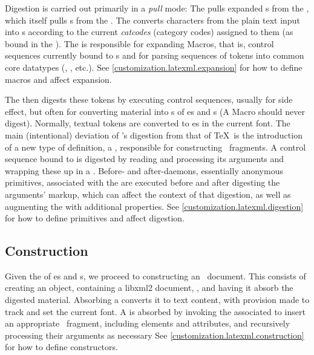 \documentclass{book}
\begin{document}
Digestion is carried out primarily in a \emph{pull} mode: The 
pulls expanded s from the , which itself pulls s from 
the .  The  converts characters from the plain text input
into s according to the current \emph{catcodes} (category codes) assigned to
them (as bound in the ).  
The  is responsible for expanding Macros,
that is, control sequences currently bound to s
and for parsing sequences of tokens into common core datatypes
(, , etc.).
See \ref{customization.latexml.expansion} for how to define macros
and affect expansion.

The  then digests these tokens by executing  control 
sequences, usually for side effect, but often for converting material
into s of es and s
(A Macro should never digest).
Normally, textual tokens are converted to es in the current font.
The main (intentional) deviation of \LaTeXML's digestion from that of \TeX\ is
the introduction of a new type of definition, a ,
responsible for constructing \XML\ fragments.
A control sequence bound to  is digested by
reading and processing its arguments and wrapping these up in a .
Before- and after-daemons, essentially anonymous primitives, associated with
the  are executed before and after digesting the 
arguments' markup, which can affect the context of that digestion, as well
as augmenting the  with additional properties.
See \ref{customization.latexml.digestion} for how to define primitives
and affect digestion.


\subsection{Construction}\label{architecture.construction}
%
%
%
Given the  of es and s,
we proceed to constructing an \XML\ document.
This consists of creating an  object, containing
a libxml2 document, , and having it absorb the digested
material. Absorbing a  converts it to text content, with provision
made to track and set the current font.
A  is absorbed by invoking the associated 
to insert an appropriate \XML\ fragment, including elements and attributes,
and recursively processing their arguments as necessary
See \ref{customization.latexml.construction} for how to define
constructors.
\end{document}

